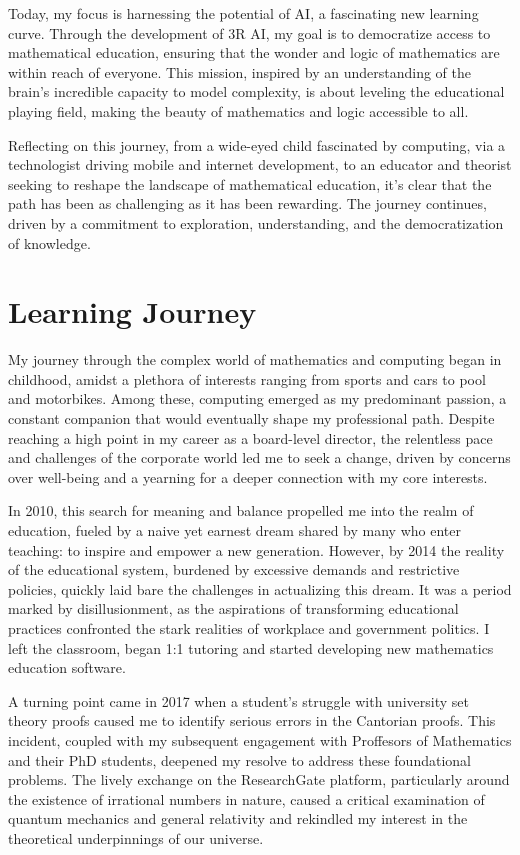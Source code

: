 \documentclass[12pt]{article}
\begin{document}
Today, my focus is harnessing the potential of AI, a fascinating new learning curve. Through the development of 3R AI, my goal is to democratize access to mathematical education, ensuring that the wonder and logic of mathematics are within reach of everyone. This mission, inspired by an understanding of the brain's incredible capacity to model complexity, is about leveling the educational playing field, making the beauty of mathematics and logic accessible to all.

Reflecting on this journey, from a wide-eyed child fascinated by computing, via a technologist driving mobile and internet development, to an educator and theorist seeking to reshape the landscape of mathematical education, it's clear that the path has been as challenging as it has been rewarding. The journey continues, driven by a commitment to exploration, understanding, and the democratization of knowledge.

\section*{Learning Journey}
My journey through the complex world of mathematics and computing began in childhood, amidst a plethora of interests ranging from sports and cars to pool and motorbikes. Among these, computing emerged as my predominant passion, a constant companion that would eventually shape my professional path. Despite reaching a high point in my career as a board-level director\rDNA{}, the relentless pace and challenges of the corporate world led me to seek a change, driven by concerns over well-being and a yearning for a deeper connection with my core interests.

In 2010, this search for meaning and balance propelled me into the realm of education\rIoE{}, fueled by a naive yet earnest dream shared by many who enter teaching: to inspire and empower a new generation. However, by 2014 the reality of the educational system, burdened by excessive demands and restrictive policies, quickly laid bare the challenges in actualizing this dream. It was a period marked by disillusionment, as the aspirations of transforming educational practices confronted the stark realities of workplace and government politics. I left the classroom, began 1:1 tutoring and started developing new mathematics education software.

A turning point came in 2017 when a student's struggle with university set theory proofs caused me to identify serious errors in the Cantorian proofs. This incident, coupled with my subsequent engagement with Proffesors of Mathematics and their PhD students, deepened my resolve to address these foundational problems. The lively exchange on the ResearchGate platform, particularly around the existence of irrational numbers in nature, caused a critical examination of quantum mechanics and general relativity and rekindled my interest in the theoretical underpinnings of our universe.
\end{document}
